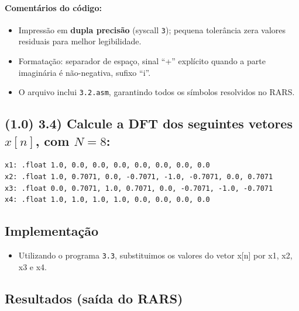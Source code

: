 \documentclass[12pt,a4paper]{article}
\begin{document}
\paragraph{Comentários do código:}
\begin{itemize}
    \item Impressão em \textbf{dupla precisão} (syscall \texttt{3}); pequena tolerância zera valores residuais para melhor legibilidade.
    \item Formatação: separador de espaço, sinal “+” explícito quando a parte imaginária é não-negativa, sufixo “i”.
    \item O arquivo inclui \texttt{3.2.asm}, garantindo todos os símbolos resolvidos no RARS.
\end{itemize}

\subsection*{(1.0) 3.4) Calcule a DFT dos seguintes vetores $x[n]$, com $N=8$:}

\begin{verbatim}
x1: .float 1.0, 0.0, 0.0, 0.0, 0.0, 0.0, 0.0, 0.0
x2: .float 1.0, 0.7071, 0.0, -0.7071, -1.0, -0.7071, 0.0, 0.7071
x3: .float 0.0, 0.7071, 1.0, 0.7071, 0.0, -0.7071, -1.0, -0.7071
x4: .float 1.0, 1.0, 1.0, 1.0, 0.0, 0.0, 0.0, 0.0
\end{verbatim}



\subsection*{Implementação}
\begin{itemize}
    \item Utilizando o programa \texttt{3.3}, substituimos os valores do vetor x[n] por x1, x2, x3 e x4.
\end{itemize}

\subsection*{Resultados (saída do RARS)}
\end{document}
